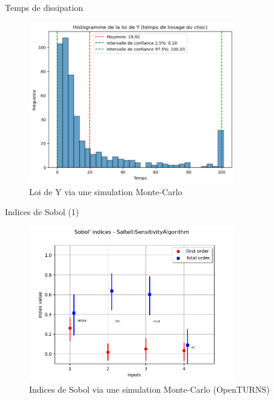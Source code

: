 \documentclass[10pt]{beamer}
\begin{document}
\begin{frame}{Temps de dissipation}
  \begin{figure}
    \centering
    \includegraphics[width=0.8\textwidth]{images/loi_de_Y.png}
    \caption{Loi de Y via une simulation Monte-Carlo}
  \end{figure}
\end{frame}

\begin{frame}{Indices de Sobol (1)}
  \begin{figure}
    \centering
    \includegraphics[width=0.8\textwidth]{images/sobol1.png}
    \caption{Indices de Sobol via une simulation Monte-Carlo (OpenTURNS)}
  \end{figure}
\end{frame}
\end{document}
